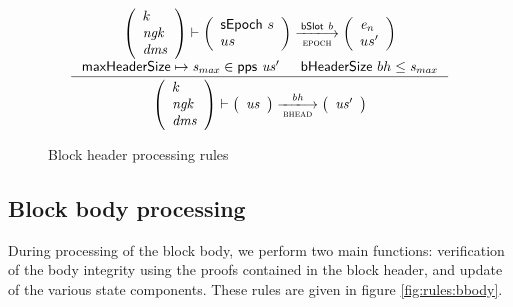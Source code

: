 \documentclass[11pt,a4paper]{article}
\newcommand{\var}[1]{\mathit{#1}}
\newcommand{\fun}[1]{\mathsf{#1}}
\newcommand{\trans}[2]{\xlongrightarrow[\textsc{#1}]{#2}}
\newcommand{\bhdrsizename}{bHeaderSize}
\newcommand{\bhdrsize}[1]{\fun{\bhdrsizename} ~ #1}
\begin{document}
\begin{figure}[ht]
  \begin{equation*}
    \inference
    {
      {\left(
        \begin{array}{l}
          k\\
          \var{ngk}\\
          \var{dms}
        \end{array}
      \right)}
      \vdash
      {\left(
          \begin{array}{l}
            \sepoch{s}\\
            us
          \end{array}
        \right)}
      \trans{epoch}{\bslot{b}}
      {\left(
          \begin{array}{l}
            \var{e_n} \\
            us'
          \end{array}
        \right)}
      \\
      \\ \maxheadersize \mapsto \var{s_{max}} \in \fun{pps}~\var{us'} & \bhdrsize{bh} \leq \var{s_{max}}
    }
    {
      {\left(
        \begin{array}{l}
          k\\
          \var{ngk}\\
          \var{dms}
        \end{array}
        \right)}
      \vdash
      \left(
        {\begin{array}{c}
           \var{us}
         \end{array}}
     \right)
     \trans{bhead}{\var{bh}}
     \left(
       {\begin{array}{c}
          \var{us'}
        \end{array}}
    \right)
  }
\end{equation*}
\caption{Block header processing rules}
\label{fig:rules:bhead}
\end{figure}

\clearpage

\subsection{Block body processing}

During processing of the block body, we perform two main functions: verification
of the body integrity using the proofs contained in the block header, and update
of the various state components. These rules are given in figure
\ref{fig:rules:bbody}.
\end{document}
